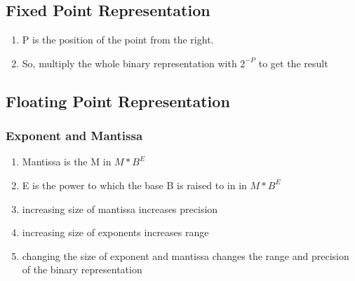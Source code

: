 \documentclass[11pt, a4paper]{article}
\begin{document}
\subsection{Fixed Point Representation}
\begin{enumerate}
    \item P is the position of the point from the right.
    \item So, multiply the whole binary representation with $2^{-P}$ to get the result
\end{enumerate}
\subsection{Floating Point Representation}
\subsubsection{Exponent and Mantissa}
\begin{enumerate}
    \item Mantissa is the M in $M * B^{E}$
    \item E is the power to which the base B is raised to in in $M * B^{E}$
    \item increasing size of mantissa increases precision
    \item increasing size of exponents increases range
    \item changing the size of exponent and mantissa changes the range and precision of the binary representation
\end{enumerate}
\end{document}
